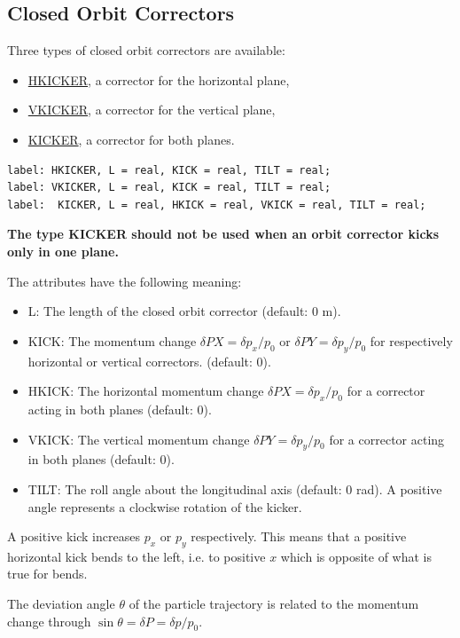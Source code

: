 \subsection{Closed Orbit Correctors}
\label{sec:closed_orbit_cor}
Three types of closed orbit correctors are available: 
\begin{itemize}
   \item \href{hkick}{HKICKER}, a corrector for the horizontal plane, 
   \item \href{vkick}{VKICKER}, a corrector for the vertical plane, 
   \item \href{kick}{KICKER}, a corrector for both planes. 
\end{itemize}

\begin{verbatim}
label: HKICKER, L = real, KICK = real, TILT = real;
label: VKICKER, L = real, KICK = real, TILT = real;
label:  KICKER, L = real, HKICK = real, VKICK = real, TILT = real;
\end{verbatim} 

{\bf The type KICKER should not be used when an orbit corrector kicks
  only in one plane.}  

The attributes have the following meaning: 
\begin{itemize}
   \item L: The length of the closed orbit corrector (default: 0 m). 
   \item KICK: The momentum change $\delta PX = \delta p_x/p_0$ or 
     $\delta PY = \delta p_y / p_0$ for respectively horizontal or vertical
     correctors. (default: 0).  
   \item HKICK: The horizontal momentum change 
     $\delta PX = \delta p_x/p_0$ for a corrector acting in both planes
     (default: 0).  
   \item VKICK: The vertical momentum change 
     $\delta PY = \delta p_y/p_0$  for a corrector acting in both planes
     (default: 0).  
   \item TILT: The roll angle about the longitudinal axis (default: 0
     rad). A positive angle represents a clockwise rotation of the
     kicker.  
\end{itemize} 

A positive kick increases $p_x$ or $p_y$ respectively. This
means that a positive horizontal kick bends to the left,  i.e. to
positive $x$ which is opposite of what is true for bends.    

The deviation angle $\theta$ of the particle trajectory is related to
the momentum change through  $\sin \theta = \delta P = \delta p / p_0$.

